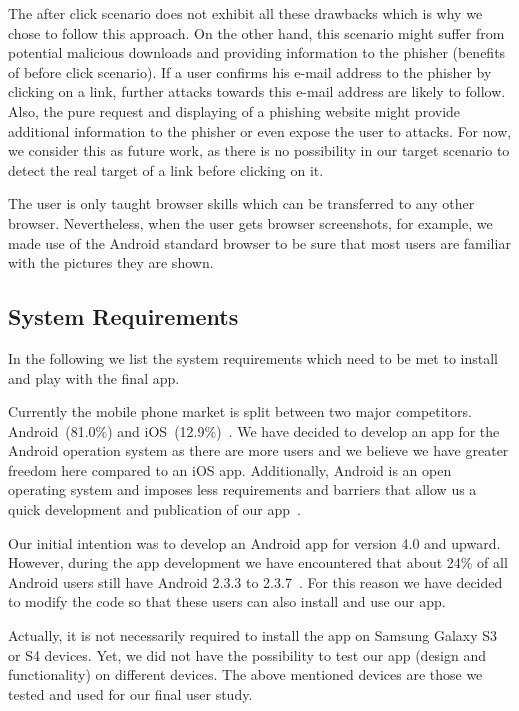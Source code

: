 \begin{description}[leftmargin=0cm]
The after click scenario does not exhibit all these drawbacks which is why we chose to follow this approach.
On the other hand, this scenario might suffer from potential malicious downloads and providing information to the phisher (benefits of before click scenario).
If a user confirms his e-mail address to the phisher by clicking on a link, further attacks towards this e-mail address are likely to follow.
Also, the pure request and displaying of a phishing website might provide additional information to the phisher or even expose the user to attacks.
For now, we consider this as future work, as there is no possibility in our target scenario to detect the real target of a link before clicking on it.

	\item[Considered Browser] The user is only taught browser skills which can be transferred to any other browser.
Nevertheless, when the user gets browser screenshots, for example, we made use of the Android standard browser to be sure that most users are familiar with the pictures they are shown.
\end{description}	

\subsection{System Requirements}
In the following we list the system requirements which need to be met to install and play with the final app.


\begin{description}[leftmargin=0cm]
	\item[Android] Currently the mobile phone market is split between two major competitors. Android~(81.0\%) and iOS~(12.9\%)~\cite{androidiosmarketshare}. 
	We have decided to develop an app for the Android operation system as there are more users and we believe we have greater freedom here compared to an iOS app. 
 	Additionally, Android is an open operating system and imposes less requirements and barriers that allow us a quick development and publication of our app~\cite{publishios, publishandroid}. 
	\item[Version] Our initial intention was to develop an Android app for version 4.0 and upward.
 However, during the app development we have encountered that about 24\% of all Android users still have Android 2.3.3 to 2.3.7~\cite{versionsandroid}. For this reason we have decided to modify the code so that these users can also install and use our app.
	\item[Samsung Galaxy S3 or S4] Actually, it is not necessarily required to install the app on Samsung Galaxy S3 or S4 devices. 
Yet, we did not have the possibility to test our app (design and functionality) on different devices.
The above mentioned devices are those we tested and used for our final user study.
\end{description}

